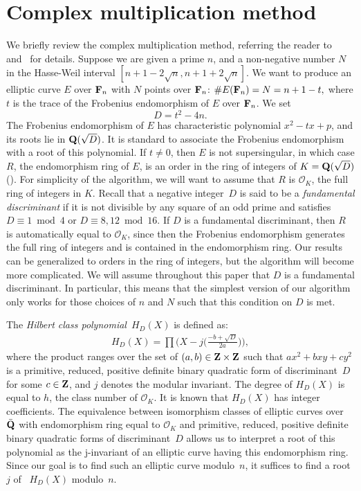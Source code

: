\documentclass{amsart}
\newcommand{\Z}{{\bf{Z}}}
\newcommand{\Q}{{\bf{Q}}}
\newcommand{\F}{{\bf{F}}}
\newcommand{\OO}{\mathcal{O}}
\newcommand{\Mid}{\mid\!\!}
\newcommand{\miD}{\!\!\mid}
\newcommand{\bigo}{{\rm O}}
\theoremstyle{plain}
\begin{document}

\section{Complex multiplication method} \label{section:cm_method}

We briefly review the complex multiplication method, referring the reader to~\cite{atmor}
and~\cite{silv2} for details.
Suppose we are given a prime $n$, and a non-negative number $N$ in
the Hasse-Weil interval $[n+1-2\sqrt{n},n+1+2\sqrt{n}]$. 
We want to produce an elliptic curve $E$ over $\F_n$ with $N$ 
points over $\F_n$:
$\#E(\F_n) = N =n+1-t,$
where $t$ is the trace of the Frobenius endomorphism of $E$ over $\F_n$.
We set $$D=t^2-4n.$$
The Frobenius endomorphism of $E$ has characteristic polynomial
$x^2-tx+p$, and its roots lie in $\Q(\sqrt{D})$.  It is standard to associate the Frobenius 
endomorphism with a root of this polynomial.  If $t\ne 0$, then $E$ is not supersingular,
in which case $R$, the endomorphism ring of $E$, is an order in the ring
of integers of $K=\Q(\sqrt{D})$ (\cite[Thm 3.1.b]{silv1}).  
For simplicity of the algorithm, we will want to assume
that $R$ is $\OO_K$, the full ring of integers in $K$.  Recall that 
a negative integer~$D$ is said to be a {\em fundamental discriminant} if it is not divisible
by any square of an odd prime and satisfies $D \equiv 1 \bmod 4$
or $D \equiv 8, 12 \bmod 16$.  If $D$ is a fundamental discriminant,
then $R$ is automatically equal to $\OO_K$, since then the Frobenius endomorphism generates the
full ring of integers and is contained in the endomorphism ring.
Our results can be generalized to orders in the ring of integers, but the 
algorithm will become more complicated. We will assume throughout this paper that $D$ is a 
fundamental discriminant.  In particular, this means that the simplest version of our
algorithm only works for those choices of $n$ and $N$ such that this condition on $D$ is met.

The {\em Hilbert class polynomial}~$H_D(X)$ is defined as:
\begin{eqnarray} \label{hdx}
H_D(X) = \prod \bigg(X - j \bigg(\frac{-b+\sqrt{D}}{2a} \bigg) \bigg),
\end{eqnarray} 
where the product ranges over the set of $(a,b) \in \Z \times \Z$ such that
$ax^2 + bxy + cy^2$ is a primitive, reduced, positive definite binary
quadratic form of discriminant~$D$ for some $c \in \Z$,
and $j$ denotes the modular invariant. The degree of $H_D(X)$ is equal
to $h$, the class number of $\OO_K$.  
It is known that $H_D(X)$ has integer coefficients.
The equivalence between isomorphism classes of elliptic curves over $\bar{\Q}$
with endomorphism ring equal to $\OO_K$ and primitive, reduced, positive 
definite binary quadratic forms of discriminant~$D$ allows us to interpret
a root of this polynomial as the j-invariant of an elliptic curve having
this endomorphism ring.  Since our goal is to find such an elliptic
curve modulo~$n$, it suffices to find a root $j$ of ~$H_D(X)$ modulo~$n$. 
\end{document}
